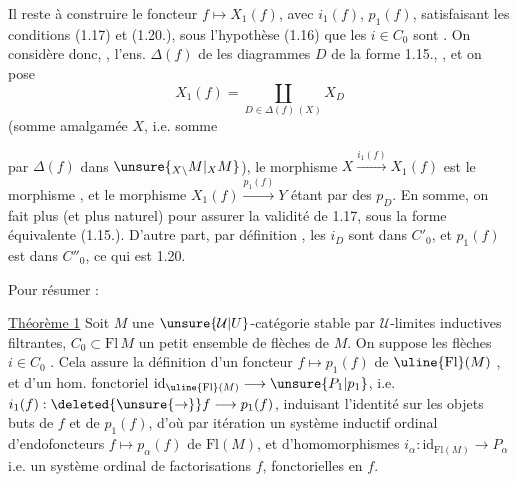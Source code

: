 
Il reste à construire le foncteur $f\mapsto X_1(f)$, avec $i_1(f)$, $p_1(f)$, satisfaisant les conditions (1.17) et (1.20.), sous l'hypothèse (1.16) que les $i\in C_0$ sont . On considère donc, , l'ens. $\Delta(f)$  de  les diagrammes $D$ de la forme 1.15., , et on pose
\[
X_1(f)=\coprod_{D\in\Delta(f)\,(X)}X_D\tag*{(1.23)}
\]
(somme amalgamée  $X$, i.e. somme 

par $\Delta(f)$ dans $\unsure{{}_{X\backslash}M|{}_X M}$), le morphisme $X\xrightarrow{i_1(f)}X_1(f)$ est le morphisme , et le morphisme $X_1(f)\xrightarrow{p_1(f)}Y$ étant   par  des $p_D$. En somme, on fait  plus  (et  plus naturel) pour assurer la validité de 1.17, sous la forme équivalente (1.15.). D'autre part, par définition , les $i_D$ sont dans $C'_0$, et $p_1(f)$ est dans $C''_0$, ce qui est 1.20.

Pour résumer :

\uline{Théorème 1} Soit $M$ une $\unsure{\mathcal U|U}$-catégorie stable par $\mathcal U$-limites inductives filtrantes, $C_0\subset\mathrm{Fl}\,M$ un petit ensemble de flèches de $M$. On suppose les flèches $i\in C_0$ . Cela assure la  définition d'un foncteur $f\mapsto p_1(f)$ de $\uline{\mathrm{Fl}}(M)$ , et d'un hom. fonctoriel  $\mathrm{id}_{\uline{\mathrm{Fl}}(M)}\longrightarrow\unsure{P_1|p_1}$, i.e. $i_1(f):\deleted{\unsure{\to}}f\longrightarrow p_1(f)$, induisant l'identité sur les objets buts de $f$ et de $p_1(f)$,
d'où par itération un système inductif ordinal d'endofoncteurs $f\mapsto p_\alpha(f)$ de $\mathrm{Fl}(M)$, et  d'homomorphismes $i_\alpha:\mathrm{id}_{\mathrm{Fl}(M)}\longrightarrow P_\alpha$ i.e.
 un système  ordinal de factorisations  $f$, fonctorielles en $f$. 

